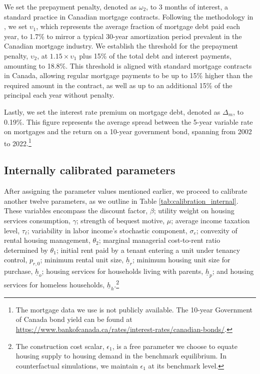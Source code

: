 \documentclass[parskip=full]{article}
\begin{document}
We set the prepayment penalty, denoted as $\omega_{2}$, to 3 months of interest, a standard practice in Canadian mortgage contracts. Following the methodology in \citet{kkk-2021}, we set $\upsilon_{1}$, which represents the average fraction of mortgage debt paid each year, to 1.7\% to mirror a typical 30-year amortization period prevalent in the Canadian mortgage industry. We establish the threshold for the prepayment penalty, $\upsilon_{2}$, at $1.15 \times \upsilon_{1}$ plus 15\% of the total debt and interest payments, amounting to 18.8\%. This threshold is aligned with standard mortgage contracts in Canada, allowing regular mortgage payments to be up to 15\% higher than the required amount in the contract, as well as up to an additional 15\% of the principal each year without penalty.

Lastly, we set the interest rate premium on mortgage debt, denoted as $\Delta_{m}$, to 0.19\%. This figure represents the average spread between the 5-year variable rate on mortgages and the return on a 10-year government bond, spanning from 2002 to 2022.\footnote{The mortgage data we use is not publicly available. The 10-year Government of Canada bond yield can be found at \url{https://www.bankofcanada.ca/rates/interest-rates/canadian-bonds/}.}

\subsection{Internally calibrated parameters}

After assigning the parameter values mentioned earlier, we proceed to calibrate another twelve parameters, as we outline in Table \ref{tab:calibration_internal}. These variables encompass the discount factor, $\beta$; utility weight on housing services consumption, $\gamma$; strength of bequest motive, $\mu$; average income taxation level, $\tau_{\ell}$; variability in labor income's stochastic component, $\sigma_{e}$; convexity of rental housing management, $\theta_{2}$; marginal managerial cost-to-rent ratio determined by $\theta_{1}$; initial rent paid by a tenant entering a unit under tenancy control, $p_{r,0}$; minimum rental unit size, $\underline{h}_{r}$; minimum housing unit size for purchase, $\underline{h}_{o}$; housing services for households living with parents, $\underline{h}_{p}$; and housing services for homeless households, $\underline{h}_{h}$.\footnote{The construction cost scalar, $\epsilon_{1}$, is a free parameter we choose to equate housing supply to housing demand in the benchmark equilibrium. In counterfactual simulations, we maintain $\epsilon_{1}$ at its benchmark level.}
\end{document}
